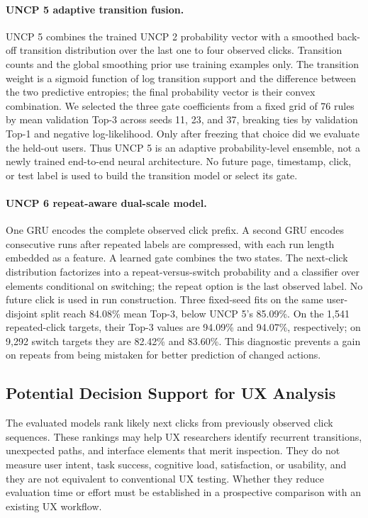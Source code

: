 \documentclass[sn-mathphys-num, Numbered]{sn-jnl}%
\theoremstyle{thmstyleone}%
\theoremstyle{thmstyletwo}%
\theoremstyle{thmstylethree}%
\providecommand{\DIFadd}[1]{{\protect\color{green!40!black}#1}} %
\providecommand{\DIFaddbegin}{} %
\newcommand{\DIFaddincludegraphics}[2][]{{\color{blue}\fbox{\DIFOincludegraphics[#1]{#2}}}} %
\DeclareRobustCommand{\DIFaddbegin}{\DIFOaddbegin \let\includegraphics\DIFaddincludegraphics} %
\begin{document}
\DIFaddbegin \paragraph{\DIFadd{UNCP 5 adaptive transition fusion.}} \DIFadd{UNCP 5 combines the trained UNCP 2 probability vector with a smoothed back-off transition distribution over the last one to four observed clicks. Transition counts and the global smoothing prior use training examples only. The transition weight is a sigmoid function of log transition support and the difference between the two predictive entropies; the final probability vector is their convex combination. We selected the three gate coefficients from a fixed grid of 76 rules by mean validation Top-3 across seeds 11, 23, and 37, breaking ties by validation Top-1 and negative log-likelihood. Only after freezing that choice did we evaluate the held-out users. Thus UNCP 5 is an adaptive probability-level ensemble, not a newly trained end-to-end neural architecture. No future page, timestamp, click, or test label is used to build the transition model or select its gate.
}

\paragraph{\DIFadd{UNCP 6 repeat-aware dual-scale model.}} \DIFadd{One GRU encodes the complete observed click prefix. A second GRU encodes consecutive runs after repeated labels are compressed, with each run length embedded as a feature. A learned gate combines the two states. The next-click distribution factorizes into a repeat-versus-switch probability and a classifier over elements conditional on switching; the repeat option is the last observed label. No future click is used in run construction. Three fixed-seed fits on the same user-disjoint split reach 84.08\% mean Top-3, below UNCP 5's 85.09\%. On the 1,541 repeated-click targets, their Top-3 values are 94.09\% and 94.07\%, respectively; on 9,292 switch targets they are 82.42\% and 83.60\%. This diagnostic prevents a gain on repeats from being mistaken for better prediction of changed actions.
}

\subsection{\DIFadd{Potential Decision Support for UX Analysis}}
\DIFadd{The evaluated models rank likely next clicks from previously observed click sequences. These rankings may help UX researchers identify recurrent transitions, unexpected paths, and interface elements that merit inspection. They do not measure user intent, task success, cognitive load, satisfaction, or usability, and they are not equivalent to conventional UX testing. Whether they reduce evaluation time or effort must be established in a prospective comparison with an existing UX workflow.
}
\end{document}
